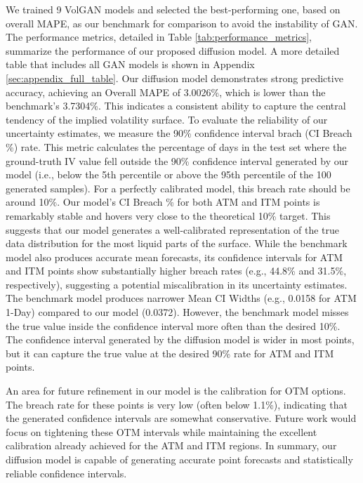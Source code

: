 \documentclass{article}
\renewcommand{\aa}[1]{{\color{magenta}#1}}
\begin{document}
We trained 9 VolGAN models and selected the best-performing one, based on overall MAPE, as our benchmark for comparison to avoid the instability of GAN. The performance metrics, detailed in Table \ref{tab:performance_metrics}, summarize the performance of our proposed diffusion model. A more detailed table that includes all GAN models is shown in Appendix \ref{sec:appendix_full_table}.
Our diffusion model demonstrates strong predictive accuracy, achieving an Overall MAPE of 3.0026\%, which is lower than the benchmark's 3.7304\%. This indicates a consistent ability to capture the central tendency of the implied volatility surface.
To evaluate the reliability of our uncertainty estimates, we measure the 90\% confidence interval brach (CI Breach \%) rate. This metric calculates the percentage of days in the test set where the ground-truth IV value fell outside the 90\% confidence interval generated by our model (i.e., below the 5th percentile or above the 95th percentile of the 100 generated samples). For a perfectly calibrated model, this breach rate should be around 10\%. Our model's CI Breach \% 
for both ATM and ITM points is remarkably stable and hovers very close to the theoretical 10\% target. This suggests that our model generates a well-calibrated representation of the true data distribution for the most liquid parts of the surface.
While the benchmark model also produces accurate mean forecasts, its confidence intervals for ATM and ITM points show substantially higher breach rates (e.g., 44.8\% and 31.5\%, respectively), suggesting a potential miscalibration in its uncertainty estimates.
The benchmark model produces narrower Mean CI Widths (e.g., 0.0158 for ATM 1-Day) compared to our model (0.0372). However, the benchmark model misses the true value inside the confidence interval more often than the desired 10\%. The confidence interval generated by the diffusion model is wider in most points, but it can capture the true value at the desired 90\% rate for ATM and ITM points.

An area for future refinement in our model is the calibration for OTM options. The breach rate for these points is very low (often below 1.1\%), indicating that the generated confidence intervals are somewhat conservative. Future work would focus on tightening these OTM intervals while maintaining the excellent calibration already achieved for the ATM and ITM regions.
In summary, our diffusion model is capable of generating accurate point forecasts and statistically reliable confidence intervals.
\end{document}
